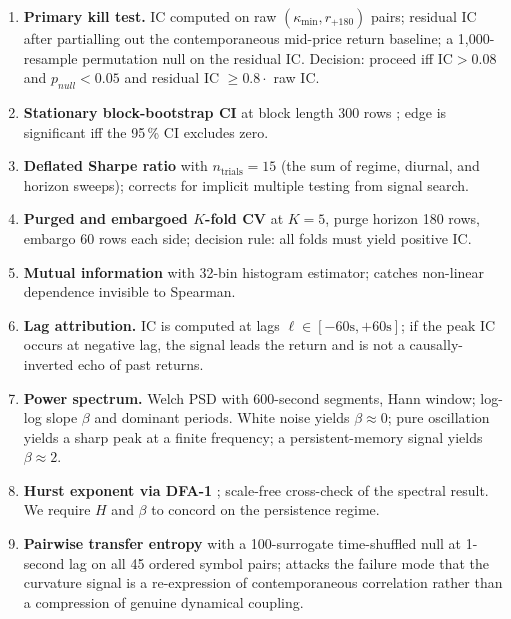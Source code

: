\documentclass[11pt,a4paper]{article}
\begin{document}
\begin{enumerate}
  \item \textbf{Primary kill test.} IC computed on raw
  $(\kappa_{\min}, r_{+180})$ pairs; residual IC after partialling out the
  contemporaneous mid-price return baseline; a 1{,}000-resample permutation
  null on the residual IC. Decision: proceed iff $\mathrm{IC}>0.08$ and
  $p_{null}<0.05$ and residual IC $\geq 0.8\cdot$ raw IC.

  \item \textbf{Stationary block-bootstrap CI} at block length 300 rows
  \citep{politis1994stationary}; edge is significant iff the 95\,\% CI
  excludes zero.

  \item \textbf{Deflated Sharpe ratio} \citep{lopezdeprado2014deflated}
  with $n_{\text{trials}}=15$ (the sum of regime, diurnal, and horizon
  sweeps); corrects for implicit multiple testing from signal search.

  \item \textbf{Purged and embargoed $K$-fold CV}
  \citep{lopezdeprado2018afml} at $K=5$, purge horizon 180 rows, embargo
  60 rows each side; decision rule: all folds must yield positive IC.

  \item \textbf{Mutual information} with 32-bin histogram estimator;
  catches non-linear dependence invisible to Spearman.

  \item \textbf{Lag attribution.} IC is computed at lags
  $\ell\in[-60\mathrm{s},+60\mathrm{s}]$; if the peak IC occurs at
  negative lag, the signal leads the return and is not a causally-inverted
  echo of past returns.

  \item \textbf{Power spectrum.} Welch PSD with 600-second segments, Hann
  window; log-log slope $\beta$ and dominant periods. White noise yields
  $\beta\approx 0$; pure oscillation yields a sharp peak at a finite
  frequency; a persistent-memory signal yields $\beta\approx 2$.

  \item \textbf{Hurst exponent via DFA-1} \citep{peng1994dfa}; scale-free
  cross-check of the spectral result. We require $H$ and $\beta$ to
  concord on the persistence regime.

  \item \textbf{Pairwise transfer entropy} \citep{schreiber2000te} with
  a 100-surrogate time-shuffled null at 1-second lag on all 45 ordered
  symbol pairs; attacks the failure mode that the curvature signal is
  a re-expression of contemporaneous correlation rather than a
  compression of genuine dynamical coupling.


\end{enumerate}
\end{document}
